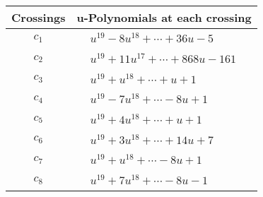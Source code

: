 \documentclass[1p]{elsarticle_modified}
\theoremstyle{definition}
\begin{document}
\begin{tabular}{m{50pt}|m{274pt}}
Crossings & \hspace{64pt}u-Polynomials at each crossing \\
\hline $$\begin{aligned}c_{1}\end{aligned}$$&$\begin{aligned}
&u^{19}-8 u^{18}+\cdots+36 u-5
\end{aligned}$\\
\hline $$\begin{aligned}c_{2}\end{aligned}$$&$\begin{aligned}
&u^{19}+11 u^{17}+\cdots+868 u-161
\end{aligned}$\\
\hline $$\begin{aligned}c_{3}\end{aligned}$$&$\begin{aligned}
&u^{19}+u^{18}+\cdots+u+1
\end{aligned}$\\
\hline $$\begin{aligned}c_{4}\end{aligned}$$&$\begin{aligned}
&u^{19}-7 u^{18}+\cdots-8 u+1
\end{aligned}$\\
\hline $$\begin{aligned}c_{5}\end{aligned}$$&$\begin{aligned}
&u^{19}+4 u^{18}+\cdots+u+1
\end{aligned}$\\
\hline $$\begin{aligned}c_{6}\end{aligned}$$&$\begin{aligned}
&u^{19}+3 u^{18}+\cdots+14 u+7
\end{aligned}$\\
\hline $$\begin{aligned}c_{7}\end{aligned}$$&$\begin{aligned}
&u^{19}+u^{18}+\cdots-8 u+1
\end{aligned}$\\
\hline $$\begin{aligned}c_{8}\end{aligned}$$&$\begin{aligned}
&u^{19}+7 u^{18}+\cdots-8 u-1
\end{aligned}$\\

\end{tabular}
\end{document}
